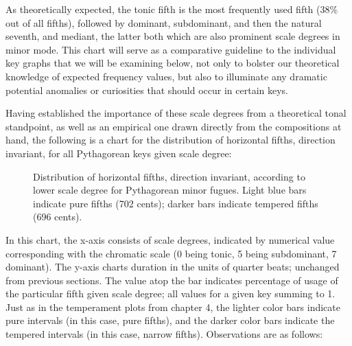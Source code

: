     As theoretically expected, the tonic fifth is the most frequently used
fifth (38\% out of all fifths), followed by dominant, subdominant, and
then the natural seventh, and mediant, the latter both which are also
prominent scale degrees in minor mode. This chart will serve as a
comparative guideline to the individual key graphs that we will be
examining below, not only to bolster our theoretical knowledge of
expected frequency values, but also to illuminate any dramatic potential
anomalies or curiosities that should occur in certain keys.

Having established the importance of these scale degrees from a
theoretical tonal standpoint, as well as an empirical one drawn directly
from the compositions at hand, the following is a chart for the
distribution of horizontal fifths, direction invariant, for all
Pythagorean keys given scale degree:



\begin{figure}[H]
    \begin{center}
    \caption[ Distribution of horizontal fifths, direction invariant, according to lower scale degree for Pythagorean minor fugues. ]{Distribution of horizontal fifths, direction invariant, according to lower scale degree for Pythagorean minor fugues. Light blue bars indicate pure fifths (702 cents); darker bars indicate tempered fifths (696 cents).}
    \end{center}
\end{figure}
    
    In this chart, the x-axis consists of scale degrees, indicated by
numerical value corresponding with the chromatic scale (0 being tonic, 5
being subdominant, 7 dominant). The y-axis charts duration in the units
of quarter beats; unchanged from previous sections. The value atop the
bar indicates percentage of usage of the particular fifth given scale
degree; all values for a given key summing to 1. Just as in the
temperament plots from chapter 4, the lighter color bars indicate pure
intervals (in this case, pure fifths), and the darker color bars
indicate the tempered intervals (in this case, narrow fifths).
Observations are as follows:

